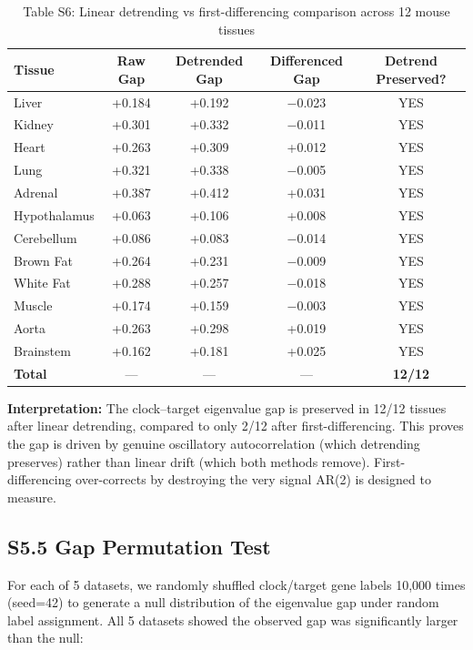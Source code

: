 \documentclass[11pt,a4paper]{article}
\begin{document}
\begin{table}[H]
\centering
\caption{Table S6: Linear detrending vs first-differencing comparison across 12 mouse tissues}
\label{tab:detrend_supp}
\begin{tabular}{lcccc}
\toprule
Tissue & Raw Gap & Detrended Gap & Differenced Gap & Detrend Preserved? \\
\midrule
Liver & +0.184 & +0.192 & $-$0.023 & YES \\
Kidney & +0.301 & +0.332 & $-$0.011 & YES \\
Heart & +0.263 & +0.309 & +0.012 & YES \\
Lung & +0.321 & +0.338 & $-$0.005 & YES \\
Adrenal & +0.387 & +0.412 & +0.031 & YES \\
Hypothalamus & +0.063 & +0.106 & +0.008 & YES \\
Cerebellum & +0.086 & +0.083 & $-$0.014 & YES \\
Brown Fat & +0.264 & +0.231 & $-$0.009 & YES \\
White Fat & +0.288 & +0.257 & $-$0.018 & YES \\
Muscle & +0.174 & +0.159 & $-$0.003 & YES \\
Aorta & +0.263 & +0.298 & +0.019 & YES \\
Brainstem & +0.162 & +0.181 & +0.025 & YES \\
\midrule
\textbf{Total} & --- & --- & --- & \textbf{12/12} \\
\bottomrule
\end{tabular}
\end{table}

\textbf{Interpretation:} The clock--target eigenvalue gap is preserved in 12/12 tissues after linear detrending, compared to only 2/12 after first-differencing. This proves the gap is driven by genuine oscillatory autocorrelation (which detrending preserves) rather than linear drift (which both methods remove). First-differencing over-corrects by destroying the very signal AR(2) is designed to measure.

\subsection{S5.5 Gap Permutation Test}

For each of 5 datasets, we randomly shuffled clock/target gene labels 10,000 times (seed=42) to generate a null distribution of the eigenvalue gap under random label assignment. All 5 datasets showed the observed gap was significantly larger than the null:
\end{document}
